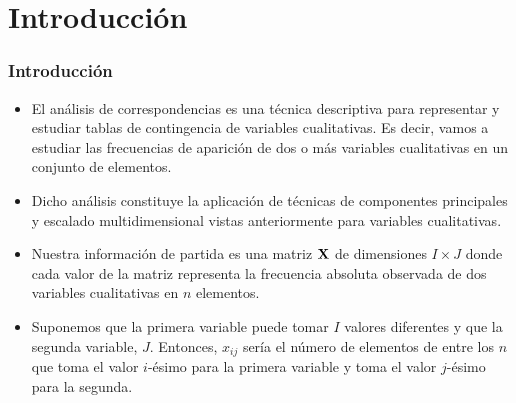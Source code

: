 



\section{Introducción}



\begin{frame}
\frametitle{Introducción}
\begin{itemize}
\item<2->{El análisis de correspondencias es una técnica descriptiva para representar y estudiar tablas de contingencia de variables cualitativas. Es decir, vamos a estudiar las frecuencias de aparición de dos o más variables cualitativas en un conjunto de elementos.}
\item<3->{Dicho análisis constituye la aplicación de técnicas de componentes principales y escalado multidimensional vistas anteriormente para variables cualitativas.}
\item<4->{Nuestra información de partida es una matriz $\mathbf{X}$ de dimensiones $I\times J$ donde cada valor de la matriz representa la frecuencia absoluta observada de dos variables cualitativas en $n$ elementos.}
\item<5->{Suponemos que la primera variable puede tomar $I$ valores diferentes y que la segunda variable, $J$. Entonces, $x_{ij}$ sería el número de elementos de entre los $n$ que toma el valor $i$-ésimo para la primera variable y toma el valor $j$-ésimo para la segunda.}
\end{itemize}
\end{frame}

